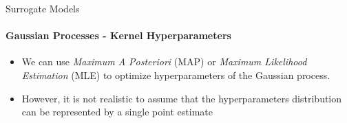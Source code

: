 

\begin{frame}[c]{Surrogate Models}
\framesubtitle{Gaussian Processes - Kernel Hyperparameters}

\begin{itemize}
    \item We can use \emph{Maximum A Posteriori} (MAP) or \emph{Maximum Likelihood Estimation} (MLE) to optimize hyperparameters of the Gaussian process.
    \item However, it is not realistic to assume that the hyperparameters distribution can be represented by a single point estimate
\end{itemize}

\end{frame}
